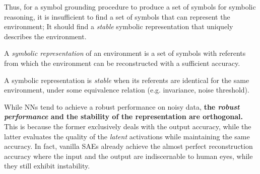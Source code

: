 Thus, for a symbol grounding procedure to produce a set of symbols for symbolic reasoning,
it is insufficient to find a set of symbols that can represent the environment;
It should find a \emph{stable} symbolic representation that uniquely describes the environment.

\begin{defi}
A \emph{symbolic representation} of an environment is a set of symbols with referents
from which the environment can be reconstructed with a sufficient accuracy.
\end{defi}

\begin{defi}
A symbolic representation is \emph{stable} when its referents are identical
for the same environment, under some equivalence relation (e.g. invariance, noise threshold).
\end{defi}



While NNs tend to achieve a robust performance on noisy data,
\textbf{the \emph{robust performance} and the stability of the representation are orthogonal.}
This is because the former exclusively deals with the output accuracy,
while the latter evaluates the quality of the \emph{latent} activations while maintaining the same accuracy.
In fact, vanilla SAEs already achieve the almost perfect reconstruction accuracy
where the input and the output are indiscernable to human eyes,
while they still exhibit instability.

